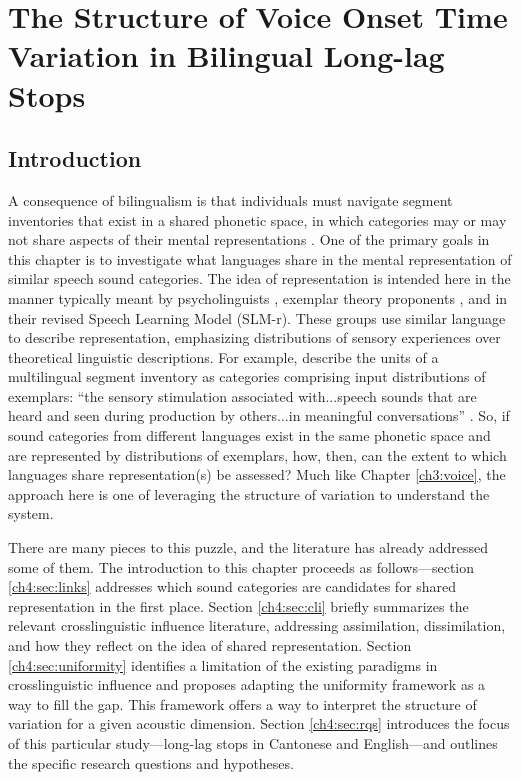 \setcounter{chapter}{3}

\chapter{The Structure of Voice Onset Time Variation in Bilingual Long-lag Stops}\label{ch4:uniformity}



\section{Introduction}\label{ch4:sec:intro}

A consequence of bilingualism is that individuals must navigate segment inventories that exist in a shared phonetic space, in which categories may or may not share aspects of their mental representations \citep{flege_2021_slmr}. One of the primary goals in this chapter is to investigate what languages share in the mental representation of similar speech sound categories. The idea of representation is intended here in the manner typically meant by psycholinguists \citep[e.g.,][]{llompart_2018_acoustic}, exemplar theory proponents \citep[e.g.,][]{amengual_2018_laterals}, and \citet{flege_2021_slmr} in their revised Speech Learning Model (SLM-r). These groups use similar language to describe representation, emphasizing distributions of sensory experiences over theoretical linguistic descriptions. For example, \citeauthor{flege_2021_slmr} describe the units of a multilingual segment inventory as categories comprising input distributions of exemplars: ``the sensory stimulation associated with...speech sounds that are heard and seen during production by others...in meaningful conversations'' \citep[][p. 32]{flege_2021_slmr}. So, if sound categories from different languages exist in the same phonetic space and are represented by distributions of exemplars, how, then, can the extent to which languages share representation(s) be assessed? Much like Chapter \ref{ch3:voice}, the approach here is one of leveraging the structure of variation to understand the system. 

There are many pieces to this puzzle, and the literature has already addressed some of them. The introduction to this chapter proceeds as follows---section \ref{ch4:sec:links} addresses which sound categories are candidates for shared representation in the first place. Section \ref{ch4:sec:cli} briefly summarizes the relevant crosslinguistic influence literature, addressing assimilation, dissimilation, and how they reflect on the idea of shared representation. Section \ref{ch4:sec:uniformity} identifies a limitation of the existing paradigms in crosslinguistic influence and proposes adapting the uniformity framework as a way to fill the gap. This framework offers a way to interpret the structure of variation for a given acoustic dimension. Section \ref{ch4:sec:rqs} introduces the focus of this particular study---long-lag stops in Cantonese and English---and outlines the specific research questions and hypotheses.

